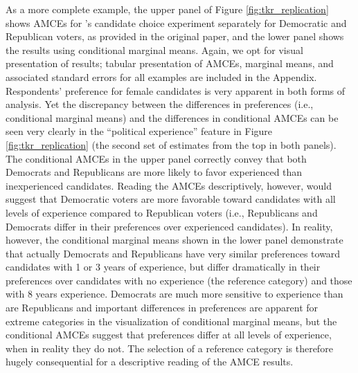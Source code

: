 \documentclass[a4paper,12pt]{article}\usepackage[]{graphicx}\usepackage[]{color}
\begin{document}
As a more complete example, the upper panel of Figure \ref{fig:tkr_replication} shows AMCEs for \citeauthor{TeeleKallaRosenbluth2018}'s candidate choice experiment separately for Democratic and Republican voters, as provided in the original paper, and the lower panel shows the results using conditional marginal means. Again, we opt for visual presentation of results; tabular presentation of AMCEs, marginal means, and associated standard errors for all examples are included in the Appendix. Respondents' preference for female candidates is very apparent in both forms of analysis. Yet the discrepancy between the differences in preferences (i.e., conditional marginal means) and the differences in conditional AMCEs can be seen very clearly in the ``political experience'' feature in Figure \ref{fig:tkr_replication} (the second set of estimates from the top in both panels). The conditional AMCEs in the upper panel correctly convey that both Democrats and Republicans are more likely to favor experienced than inexperienced candidates. Reading the AMCEs descriptively, however, would suggest that Democratic voters are more favorable toward candidates with all levels of experience compared to Republican voters (i.e., Republicans and Democrats differ in their preferences over experienced candidates). In reality, however, the conditional marginal means shown in the lower panel demonstrate that actually Democrats and Republicans have very similar preferences toward candidates with 1 or 3 years of experience, but differ dramatically in their preferences over candidates with no experience (the reference category) and those with 8 years experience. Democrats are much more sensitive to experience than are Republicans and important differences in preferences are apparent for extreme categories in the visualization of conditional marginal means, but the conditional AMCEs suggest that preferences differ at all levels of experience, when in reality they do not. The selection of a reference category is therefore hugely consequential for a descriptive reading of the AMCE results.
\end{document}
